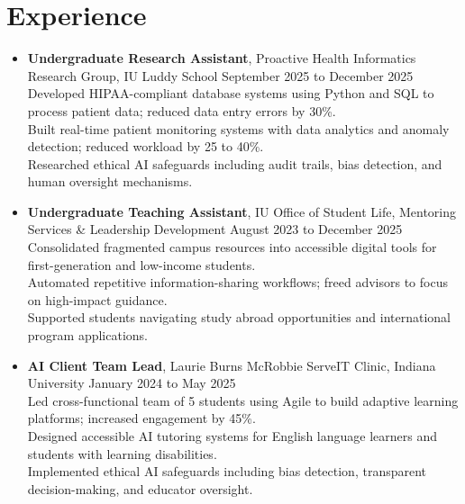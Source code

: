 \documentclass[11pt]{article}
\begin{document}
\section*{Experience}
\begin{itemize}[leftmargin=*]
    \item \textbf{Undergraduate Research Assistant}, Proactive Health Informatics Research Group, IU Luddy School \hfill September 2025 to December 2025\\
    Developed HIPAA-compliant database systems using Python and SQL to process patient data; reduced data entry errors by 30\%.\\
    Built real-time patient monitoring systems with data analytics and anomaly detection; reduced workload by 25 to 40\%.\\
    Researched ethical AI safeguards including audit trails, bias detection, and human oversight mechanisms.

    \item \textbf{Undergraduate Teaching Assistant}, IU Office of Student Life, Mentoring Services \& Leadership Development \hfill August 2023 to December 2025\\
    Consolidated fragmented campus resources into accessible digital tools for first-generation and low-income students.\\
    Automated repetitive information-sharing workflows; freed advisors to focus on high-impact guidance.\\
    Supported students navigating study abroad opportunities and international program applications.

    \item \textbf{AI Client Team Lead}, Laurie Burns McRobbie ServeIT Clinic, Indiana University \hfill January 2024 to May 2025\\
    Led cross-functional team of 5 students using Agile to build adaptive learning platforms; increased engagement by 45\%.\\
    Designed accessible AI tutoring systems for English language learners and students with learning disabilities.\\
    Implemented ethical AI safeguards including bias detection, transparent decision-making, and educator oversight.
\end{itemize}
\end{document}
